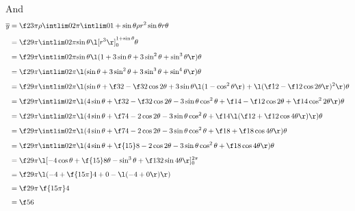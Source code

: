 \documentclass[a4paper]{article}
\begin{document}
And \begin{align*}
\overline y &= \f2{3\pi\rho} \intlim 0{2\pi} {\intlim 0 {1 + \sin \theta} {\rho r^2 \sin \theta} r} \theta\\[1ex]
&= \f2{9\pi} \intlim 0{2\pi} {\sin \theta \l[r^3\r]_0^{1 + \sin\theta}} \theta\\[1ex]
&= \f2{9\pi} \intlim 0{2\pi} {\sin \theta \l( 1 + 3\sin\theta + 3\sin^2 \theta + \sin^3 \theta \r)} \theta\\[1ex]
&= \f2{9\pi} \intlim 0{2\pi} {\l( \sin\theta + 3\sin^2 \theta + 3\sin^3 \theta + \sin^4 \theta \r)} \theta\\[1ex]
&= \f2{9\pi} \intlim 0{2\pi} {\l( \sin\theta + \f32 - \f32 \cos 2\theta + 3 \sin \theta \l(1 - \cos^2 \theta\r) + \l( \f12 - \f12 \cos 2\theta \r)^2 \r)} \theta\\[1ex]
&= \f2{9\pi} \intlim 0{2\pi} {\l( 4 \sin\theta + \f32 - \f32 \cos 2\theta - 3 \sin\theta \cos^2 \theta + \f14 - \f12 \cos 2\theta + \f14 \cos^2 2\theta \r)} \theta\\[1ex]
&= \f2{9\pi} \intlim 0{2\pi} {\l( 4 \sin\theta + \f74 - 2 \cos 2\theta - 3 \sin\theta \cos^2 \theta + \f14 \l( \f12 + \f12 \cos 4\theta \r) \r)} \theta\\[1ex]
&= \f2{9\pi} \intlim 0{2\pi} {\l( 4 \sin\theta + \f74 - 2 \cos 2\theta - 3 \sin\theta \cos^2 \theta + \f18 + \f18 \cos 4\theta \r)} \theta\\[1ex]
&= \f2{9\pi} \intlim 0{2\pi} {\l( 4 \sin\theta + \f{15}8 - 2 \cos 2\theta - 3 \sin\theta \cos^2 \theta + \f18 \cos 4\theta \r)} \theta\\[1ex]
&= \f2{9\pi} \l[ -4\cos\theta + \f{15}8 \theta - \sin^3 \theta + \f1{32}\sin 4\theta \r]_0^{2\pi}\\[1ex]
&= \f2{9\pi} \l( -4 + \f{15\pi}4 + 0 - \l( -4 + 0 \r) \r)\\[1ex]
&= \f2{9\pi} \, \f{15\pi}4\\[1ex]
&= \f56
\end{align*}


\subsection{~}
\end{document}
